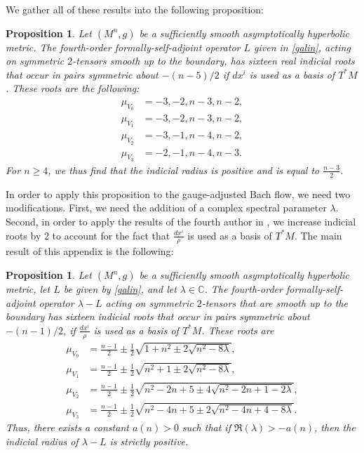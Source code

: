 \documentclass[10pt,reqno]{amsart}
\newtheorem{prop}[theorem]{Proposition}
\begin{document}
We gather all of these results into the following proposition: 
\begin{prop}
\label{prop: ind rts} Let $(M^n,g)$ be a sufficiently smooth asymptotically hyperbolic metric.  The fourth-order formally-self-adjoint operator $L$ given in \eqref{galin}, acting on symmetric $2$-tensors smooth up to the boundary,  has sixteen real indicial roots that occur in pairs symmetric about $-(n-5)/2$ if $dx^i$ is used as a basis of $T^*M$.  These roots are the following:
\begin{align*}
\mu_{V_0}&=-3,-2,n-3,n-2,\\
\mu_{V_1}&=-3,-2,n-3,n-2,\\
\mu_{V_2}&=-3,-1,n-4,n-2,\\
\mu_{V_3}&=-2, -1, n-4, n-3.
\end{align*}
For $n \geq 4$, we thus find that the indicial radius is positive and is equal to $\frac{n-3}{2}$.
\end{prop} 
In order to apply this proposition to the gauge-adjusted Bach flow, we need two modifications.  First, we need the addition of a complex spectral parameter $\lambda$.  Second, in order to apply the results of the fourth author in \cite{Ma-edge}, we increase indicial roots by $2$ to account for the fact that $\frac{dx^i}{\rho}$ is used as a basis of $T^*M$.  The main result of this appendix is the following:

\begin{prop} \label{prop:ind-poly} Let $(M^n,g)$ be a sufficiently smooth asymptotically hyperbolic metric, let $L$ be given by \eqref{galin}, and  let $\lambda \in \mathbb{C}$.  The fourth-order formally-self-adjoint operator $\lambda - L$ acting on symmetric $2$-tensors that are smooth up to the boundary has sixteen indicial roots that occur in pairs symmetric about $-(n-1)/2$, if $\frac{dx^i}{\rho}$ is used as a basis of $T^*M$.  These roots are
\begin{align*}
\mu_{V_0} &= \frac{n-1}{2} \pm \frac{1}{2}\sqrt{ 1 + n^2 \pm 2 \sqrt{n^2 - 8 \lambda}}, \\
\mu_{V_1} &= \frac{n-1}{2} \pm \frac{1}{2}\sqrt{ n^2 +1  \pm 2 \sqrt{n^2 - 8 \lambda}},\\
\mu_{V_2} &= \frac{n-1}{2} \pm \frac{1}{2}\sqrt{ n^2 -2n + 5  \pm 4 \sqrt{n^2 -2n +1 -2 \lambda}},\\
\mu_{V_3} &= \frac{n-1}{2} \pm \frac{1}{2}\sqrt{ n^2 - 4n + 5 \pm 2 \sqrt{n^2 - 4n + 4 - 8 \lambda}}.
\end{align*}
Thus, there exists a constant $a(n) > 0$ such that if $\Re(\lambda) > - a(n)$, then the indicial radius of $\lambda - L$ is strictly positive. 
\end{prop}
\end{document}

